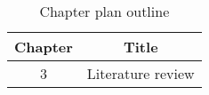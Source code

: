 \begin{table}[h!]
\centering
\begin{tabular}{cc}
{Chapter} & {Title} \\ \midrule
{3} & {Literature review} \\
\end{tabular}
\caption{Chapter plan outline}
\label{table:1}
\end{table}